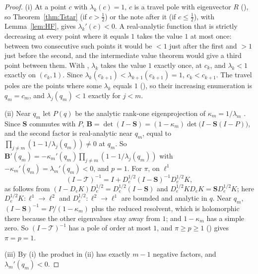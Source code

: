 \documentclass[11pt]{article}
\theoremstyle{plain}
\theoremstyle{definition}
\theoremstyle{remark}
\begin{document}
\begin{proof}
(i) At a point $c$ with $\lambda_k(c)=1$, $c$ is a travel pole with eigenvector $R$
({\cite[Corollary ``the travel poles are Hahn--Exton zeros'', \textup{cor:qbessel}]{Bonfioli2026bA}}), so Theorem~\ref{thm:Tstar} (if $c>\tfrac12$) or the note after it (if $c\le\tfrac12$), with
Lemma~\ref{lem:HF}, gives $\lambda_k'(c)<0$. A real-analytic function that is strictly decreasing at
every point where it equals $1$ takes the value $1$ at most once: between two consecutive such points
it would be $<1$ just after the first and $>1$ just before the second, and the intermediate value
theorem would give a third point between them. With {\cite[Proposition ``infinitely many travel poles, without $T_2$'', \textup{prop:infpolesalt}]{Bonfioli2026bA}}, $\lambda_k$
takes the value $1$ exactly once, at $c_k$, and $\lambda_k<1$ exactly on $(c_k,1)$. Since
$\lambda_k(c_{k+1})<\lambda_{k+1}(c_{k+1})=1$, $c_k<c_{k+1}$. The travel poles are the points where
some $\lambda_k$ equals $1$ ({\cite[Corollary ``the travel poles are Hahn--Exton zeros'', \textup{cor:qbessel}]{Bonfioli2026bA}}), so their increasing enumeration is
$q_m=c_m$, and $\lambda_j(q_m)<1$ exactly for $j<m$.

(ii) Near $q_m$ let $P(q)$ be the analytic rank-one eigenprojection of $\kappa_m=1/\lambda_m$
\cite[Ch.~VII]{Kato}. Since $\mathbf S$ commutes with $P$,
$\mathbf B=\det(I-\mathbf S)=(1-\kappa_m)\det\bigl(I-\mathbf S(I-P)\bigr)$, and the second factor
is real-analytic near $q_m$, equal to $\prod_{j\ne m}(1-1/\lambda_j(q_m))\ne0$ at $q_m$. So
$\mathbf B'(q_m)=-\kappa_m'(q_m)\prod_{j\ne m}(1-1/\lambda_j(q_m))$ with
$-\kappa_m'(q_m)=\lambda_m'(q_m)<0$, and $p=1$. For $\pi$, on $\ell^1$
\[
   (I-\mathcal T)^{-1}=I+D_e^{1/2}(I-\mathbf S)^{-1}D_e^{1/2}K,
\]
as follows from $(I-D_eK)D_e^{1/2}=D_e^{1/2}(I-\mathbf S)$ and $D_e^{1/2}KD_eK=\mathbf SD_e^{1/2}K$;
here $D_e^{1/2}K:\ell^1\to\ell^2$ and $D_e^{1/2}:\ell^2\to\ell^1$ are bounded and analytic in $q$.
Near $q_m$, $(I-\mathbf S)^{-1}=P/(1-\kappa_m)$ plus the reduced resolvent, which is holomorphic
there because the other eigenvalues stay away from $1$; and $1-\kappa_m$ has a simple zero. So
$(I-\mathcal T)^{-1}$ has a pole of order at most $1$, and $\pi\ge p\ge1$
({\cite[Proposition ``the shape of the local form'', \textup{prop:shape}]{Bonfioli2026bA}}) gives $\pi=p=1$.

(iii) By (i) the product in (ii) has exactly $m-1$ negative factors, and $\lambda_m'(q_m)<0$.
\end{proof}
\end{document}
